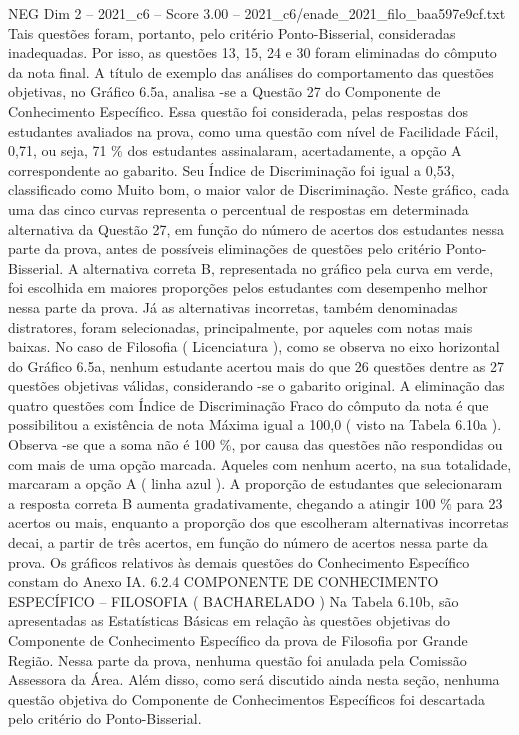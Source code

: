 \begin{textsample}{NEG Dim 2 – 2021\_c6 – Score 3.00 – 2021\_c6/enade\_2021\_filo\_baa597e9cf.txt}
Tais questões foram, portanto, pelo critério Ponto-Bisserial, consideradas inadequadas.
Por isso, as questões 13, 15, 24 e 30 foram eliminadas do cômputo da nota final.
A título de exemplo das análises do comportamento das questões objetivas, no Gráfico 6.5a, analisa -se a Questão 27 do Componente de Conhecimento Específico.
Essa questão foi considerada, pelas respostas dos estudantes avaliados na prova, como uma questão com nível de Facilidade Fácil, 0,71, ou seja, 71 \% dos estudantes assinalaram, acertadamente, a opção A correspondente ao gabarito.
Seu Índice de Discriminação foi igual a 0,53, classificado como Muito bom, o maior valor de Discriminação.
Neste gráfico, cada uma das cinco curvas representa o percentual de respostas em determinada alternativa da Questão 27, em função do número de acertos dos estudantes nessa parte da prova, antes de possíveis eliminações de questões pelo critério Ponto-Bisserial.
A alternativa correta B, representada no gráfico pela curva em verde, foi escolhida em maiores proporções pelos estudantes com desempenho melhor nessa parte da prova.
Já as alternativas incorretas, também denominadas distratores, foram selecionadas, principalmente, por aqueles com notas mais baixas.
No caso de Filosofia ( Licenciatura ), como se observa no eixo horizontal do Gráfico 6.5a, nenhum estudante acertou mais do que 26 questões dentre as 27 questões objetivas válidas, considerando -se o gabarito original.
A eliminação das quatro questões com Índice de Discriminação Fraco do cômputo da nota é que possibilitou a existência de nota Máxima igual a 100,0 ( visto na Tabela 6.10a ).
Observa -se que a soma não é 100 \%, por causa das questões não respondidas ou com mais de uma opção marcada.
Aqueles com nenhum acerto, na sua totalidade, marcaram a opção A ( linha azul ).
A proporção de estudantes que selecionaram a resposta correta B aumenta gradativamente, chegando a atingir 100 \% para 23 acertos ou mais, enquanto a proporção dos que escolheram alternativas incorretas decai, a partir de três acertos, em função do número de acertos nessa parte da prova.
Os gráficos relativos às demais questões do Conhecimento Específico constam do Anexo IA. 6.2.4 COMPONENTE DE CONHECIMENTO ESPECÍFICO – FILOSOFIA ( BACHARELADO ) Na Tabela 6.10b, são apresentadas as Estatísticas Básicas em relação às questões objetivas do Componente de Conhecimento Específico da prova de Filosofia por Grande Região.
Nessa parte da prova, nenhuma questão foi anulada pela Comissão Assessora da Área.
Além disso, como será discutido ainda nesta seção, nenhuma questão objetiva do Componente de Conhecimentos Específicos foi descartada pelo critério do Ponto-Bisserial.

\end{textsample}
